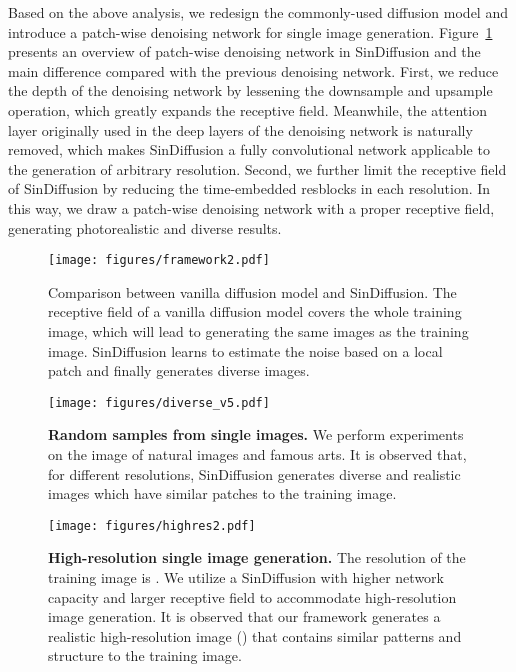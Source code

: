 \documentclass[10pt,twocolumn,letterpaper]{article}
\begin{document}
Based on the above analysis, we redesign the commonly-used diffusion model and introduce a patch-wise denoising network for single image generation.
Figure~\ref{fig:framework2} presents an overview of patch-wise denoising network in SinDiffusion and the main difference compared with the previous denoising network.
First, we reduce the depth of the denoising network by lessening the downsample and upsample operation, which greatly expands the receptive field.
Meanwhile, the attention layer originally used in the deep layers of the denoising network is naturally removed, which makes SinDiffusion a fully convolutional network applicable to the generation of arbitrary resolution.
Second, we further limit the receptive field of SinDiffusion by reducing the time-embedded resblocks in each resolution.
In this way, we draw a patch-wise denoising network with a proper receptive field, generating photorealistic and diverse results.

\begin{figure}[t]
  \centering
   \texttt{[image: figures/framework2.pdf]}
   \vspace{-6mm}
   \caption{
   Comparison between vanilla diffusion model and SinDiffusion.
   The receptive field of a vanilla diffusion model covers the whole training image, which will lead to generating the same images as the training image.
   SinDiffusion learns to estimate the noise based on a local patch and finally generates diverse images.
   }
   \vspace{-4mm}
   \label{fig:framework2}
\end{figure}

\begin{figure*}[t]
  \centering
   \texttt{[image: figures/diverse\_v5.pdf]}
   \vspace{-7mm}
   \caption{
   \textbf{Random samples from single images.}
   We perform experiments on the image of natural images and famous arts.
   It is observed that, for different resolutions, SinDiffusion generates diverse and realistic images which have similar patches to the training image. 
   }
   \vspace{-4mm}
   \label{fig:diverse}
\end{figure*}

\begin{figure*}[t]
  \centering
   \texttt{[image: figures/highres2.pdf]}
   \vspace{-7mm}
   \caption{
   \textbf{High-resolution single image generation.}
   The resolution of the training image is .
   We utilize a SinDiffusion with higher network capacity and larger receptive field to accommodate high-resolution image generation.
   It is observed that our framework generates a realistic high-resolution image () that contains similar patterns and structure to the training image.
   }
   \vspace{-5mm}
   \label{fig:highres}
\end{figure*}
\end{document}
